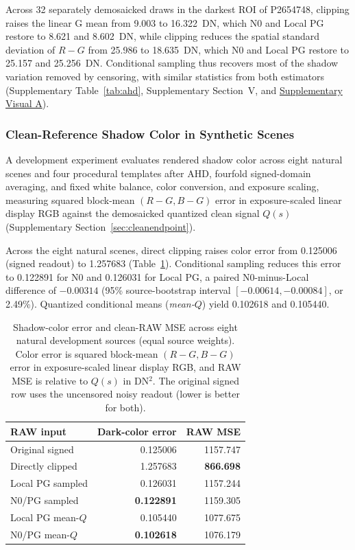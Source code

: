 \documentclass[10pt,twocolumn,journal]{IEEEtran}
\begin{document}
Across 32 separately demosaicked draws in the darkest ROI of P2654748, clipping raises the linear G mean from 9.003 to 16.322~DN, which N0 and Local PG restore to 8.621 and 8.602~DN, while clipping reduces the spatial standard deviation of $R-G$ from 25.986 to 18.635~DN, which N0 and Local PG restore to 25.157 and 25.256~DN. Conditional sampling thus recovers most of the shadow variation removed by censoring, with similar statistics from both estimators (Supplementary Table~\ref{tab:ahd}, Supplementary Section~V, and \href{visual_en.pdf}{Supplementary Visual A}).

\subsubsection{Clean-Reference Shadow Color in Synthetic Scenes}
A development experiment evaluates rendered shadow color across eight natural scenes and four procedural templates after AHD, fourfold signed-domain averaging, and fixed white balance, color conversion, and exposure scaling, measuring squared block-mean $(R-G,B-G)$ error in exposure-scaled linear display RGB against the demosaicked quantized clean signal $Q(s)$ (Supplementary Section~\ref{sec:cleanendpoint}).

Across the eight natural scenes, direct clipping raises color error from 0.125006 (signed readout) to 1.257683 (Table~\ref{tab:cleanendpoint}). Conditional sampling reduces this error to 0.122891 for N0 and 0.126031 for Local PG, a paired N0-minus-Local difference of $-0.00314$ (95\% source-bootstrap interval $[-0.00614,-0.00084]$, or 2.49\%). Quantized conditional means (\emph{mean-$Q$}) yield 0.102618 and 0.105440.

\begin{table}[t]
\centering
\caption{Shadow-color error and clean-RAW MSE across eight natural development sources (equal source weights). Color error is squared block-mean $(R-G,B-G)$ error in exposure-scaled linear display RGB, and RAW MSE is relative to $Q(s)$ in DN$^2$. The original signed row uses the uncensored noisy readout (lower is better for both).}
\label{tab:cleanendpoint}
\small
\setlength{\tabcolsep}{4pt}
\begin{tabular}{@{}lrr@{}}
\toprule
RAW input & Dark-color error & RAW MSE\\
\midrule
Original signed & 0.125006 & 1157.747\\
Directly clipped & 1.257683 & \textbf{866.698}\\
Local PG sampled & 0.126031 & 1157.244\\
N0/PG sampled & \textbf{0.122891} & 1159.305\\
Local PG mean-$Q$ & 0.105440 & 1077.675\\
N0/PG mean-$Q$ & \textbf{0.102618} & 1076.179\\
\bottomrule
\end{tabular}
\end{table}
\end{document}
